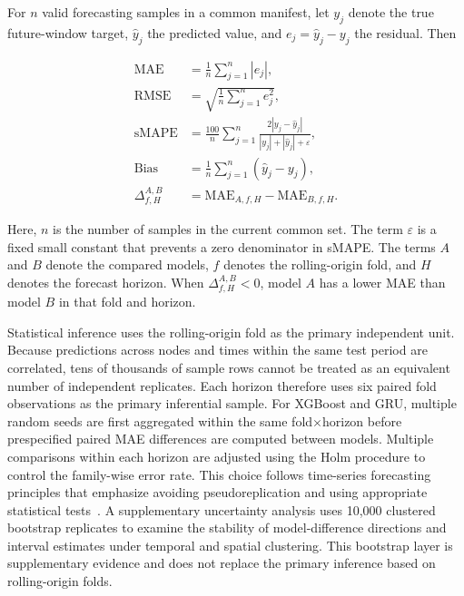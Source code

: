 \documentclass[pdflatex,sn-mathphys-num,iicol]{sn-jnl}
\begin{document}
For $n$ valid forecasting samples in a common manifest, let $y_j$ denote the true future-window target, $\hat{y}_j$ the predicted value, and $e_j=\hat{y}_j-y_j$ the residual. Then

\begin{equation}
\begin{aligned}
\mathrm{MAE}
&=
\frac{1}{n}
\sum_{j=1}^{n}
|e_j|,
\\[6pt]
\mathrm{RMSE}
&=
\sqrt{
\frac{1}{n}
\sum_{j=1}^{n}
e_j^{2}
},
\\[6pt]
\mathrm{sMAPE}
&=
\frac{100}{n}
\sum_{j=1}^{n}
\frac{
2|y_j-\hat{y}_j|
}{
|y_j|+|\hat{y}_j|+\varepsilon
},
\\[6pt]
\mathrm{Bias}
&=
\frac{1}{n}
\sum_{j=1}^{n}
(\hat{y}_j-y_j),
\\[6pt]
\Delta_{f,H}^{A,B}
&=
\mathrm{MAE}_{A,f,H}
-
\mathrm{MAE}_{B,f,H}.
\end{aligned}
\label{eq:evaluation-metrics}
\end{equation}

Here, $n$ is the number of samples in the current common set. The term $\varepsilon$ is a fixed small constant that prevents a zero denominator in sMAPE. The terms $A$ and $B$ denote the compared models, $f$ denotes the rolling-origin fold, and $H$ denotes the forecast horizon. When $\Delta_{f,H}^{A,B}<0$, model $A$ has a lower MAE than model $B$ in that fold and horizon.

Statistical inference uses the rolling-origin fold as the primary independent unit. Because predictions across nodes and times within the same test period are correlated, tens of thousands of sample rows cannot be treated as an equivalent number of independent replicates. Each horizon therefore uses six paired fold observations as the primary inferential sample. For XGBoost and GRU, multiple random seeds are first aggregated within the same fold$\times$horizon before prespecified paired MAE differences are computed between models. Multiple comparisons within each horizon are adjusted using the Holm procedure to control the family-wise error rate. This choice follows time-series forecasting principles that emphasize avoiding pseudoreplication and using appropriate statistical tests~\cite{Hewamalage2023ForecastEvaluation,GarciaPerez2023MultipleTesting}. A supplementary uncertainty analysis uses 10,000 clustered bootstrap replicates to examine the stability of model-difference directions and interval estimates under temporal and spatial clustering. This bootstrap layer is supplementary evidence and does not replace the primary inference based on rolling-origin folds.
\end{document}
